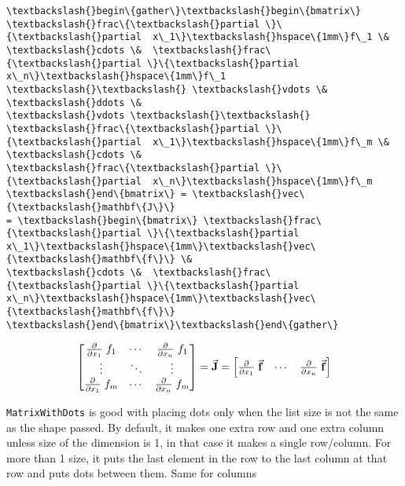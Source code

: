 \documentclass[11pt]{article}
\begin{document}
    \begin{Verbatim}[commandchars=\\\{\}]
\textbackslash{}begin\{gather\}\textbackslash{}begin\{bmatrix\} \textbackslash{}frac\{\textbackslash{}partial \}\{\textbackslash{}partial  x\_1\}\textbackslash{}hspace\{1mm\}f\_1 \&
\textbackslash{}cdots \&  \textbackslash{}frac\{\textbackslash{}partial \}\{\textbackslash{}partial  x\_n\}\textbackslash{}hspace\{1mm\}f\_1 \textbackslash{}\textbackslash{} \textbackslash{}vdots \&  \textbackslash{}ddots \&
\textbackslash{}vdots \textbackslash{}\textbackslash{} \textbackslash{}frac\{\textbackslash{}partial \}\{\textbackslash{}partial  x\_1\}\textbackslash{}hspace\{1mm\}f\_m \&  \textbackslash{}cdots \&
\textbackslash{}frac\{\textbackslash{}partial \}\{\textbackslash{}partial  x\_n\}\textbackslash{}hspace\{1mm\}f\_m \textbackslash{}end\{bmatrix\} = \textbackslash{}vec\{\textbackslash{}mathbf\{J\}\}
= \textbackslash{}begin\{bmatrix\} \textbackslash{}frac\{\textbackslash{}partial \}\{\textbackslash{}partial  x\_1\}\textbackslash{}hspace\{1mm\}\textbackslash{}vec\{\textbackslash{}mathbf\{f\}\} \&
\textbackslash{}cdots \&  \textbackslash{}frac\{\textbackslash{}partial \}\{\textbackslash{}partial  x\_n\}\textbackslash{}hspace\{1mm\}\textbackslash{}vec\{\textbackslash{}mathbf\{f\}\}
\textbackslash{}end\{bmatrix\}\textbackslash{}end\{gather\}
    \end{Verbatim}

    \[ \begin{gather}\begin{bmatrix} \frac{\partial }{\partial  x_1}\hspace{1mm}f_1 &  \cdots &  \frac{\partial }{\partial  x_n}\hspace{1mm}f_1 \\ \vdots &  \ddots &  \vdots \\ \frac{\partial }{\partial  x_1}\hspace{1mm}f_m &  \cdots &  \frac{\partial }{\partial  x_n}\hspace{1mm}f_m \end{bmatrix} = \vec{\mathbf{J}} = \begin{bmatrix} \frac{\partial }{\partial  x_1}\hspace{1mm}\vec{\mathbf{f}} &  \cdots &  \frac{\partial }{\partial  x_n}\hspace{1mm}\vec{\mathbf{f}} \end{bmatrix}\end{gather} \]

    \texttt{MatrixWithDots} is good with placing dots only when the list
size is not the same as the shape passed. By default, it makes one extra
row and one extra column unless size of the dimension is 1, in that case
it makes a single row/column. For more than 1 size, it puts the last
element in the row to the last column at that row and puts dots between
them. Same for columns
\end{document}
